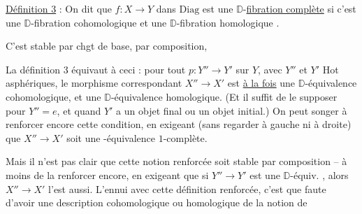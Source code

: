 

\uline{Définition 3} : On dit que $f:X\to Y$ dans $\mathrm{Diag}$ est une $\mathbb D$-\uline{fibration complète} si c'est une $\mathbb D$-fibration cohomologique  et une $\mathbb D$-fibration homologique .

C'est stable par chgt de base, par composition,


La définition 3 équivaut à ceci : pour tout $p:Y''\to Y'$ sur $Y$, avec $Y''$ et $Y'$ Hot asphériques, le morphisme correspondant $X''\to X'$ est \uline{à la fois} une $\mathbb D$-équivalence cohomologique, et une $\mathbb D$-équivalence homologique. (Et il suffit \unsure{$=$} de le supposer pour $Y''=e$, et quand $Y'$ a un objet final ou un objet initial.) On peut songer à renforcer encore cette condition, en exigeant (sans regarder à gauche ni à droite) que $X''\to X'$ soit une -équivalence $1$-complète.

Mais il n'est pas clair que cette notion renforcée soit stable par composition -- à moins de la renforcer encore, en exigeant que si $Y''\to Y'$ est une $\mathbb D$-équiv. , alors $X''\to X'$ l'est aussi. L'ennui avec cette définition renforcée, c'est que faute d'avoir une description cohomologique ou homologique de la notion de

